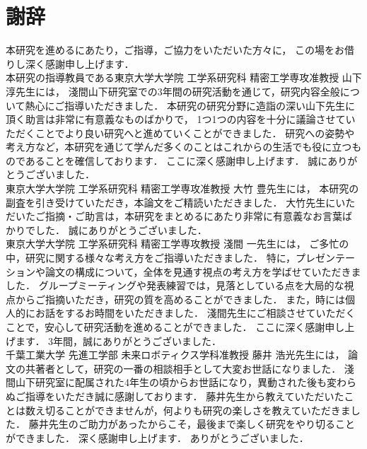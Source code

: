 \chapter*{謝辞}
\thispagestyle{empty}
\label{thankyou}

\newpage

本研究を進めるにあたり，ご指導，ご協力をいただいた方々に，
この場をお借りし深く感謝申し上げます．
\\

本研究の指導教員である東京大学大学院 工学系研究科 精密工学専攻准教授 山下 淳先生には，
淺間山下研究室での3年間の研究活動を通じて，研究内容全般について熱心にご指導いただきました．
本研究の研究分野に造詣の深い山下先生に頂く助言は非常に有意義なものばかりで，
1つ1つの内容を十分に議論させていただくことでより良い研究へと進めていくことができました．
研究への姿勢や考え方など，本研究を通じて学んだ多くのことはこれからの生活でも役に立つものであることを確信しております．
ここに深く感謝申し上げます．
誠にありがとうございました．
\\

東京大学大学院 工学系研究科 精密工学専攻准教授 大竹 豊先生には，
本研究の副査を引き受けていただき，本論文をご精読いただきました．
大竹先生にいただいたご指摘・ご助言は，本研究をまとめるにあたり非常に有意義なお言葉ばかりでした．
誠にありがとうございました．
\\

東京大学大学院 工学系研究科 精密工学専攻教授 淺間 一先生には，
ご多忙の中，研究に関する様々な考え方をご指導いただきました．
特に，プレゼンテーションや論文の構成について，全体を見通す視点の考え方を学ばせていただきました．
グループミーティングや発表練習では，見落としている点を大局的な視点からご指摘いただき，研究の質を高めることができました．
また，時には個人的にお話をするお時間をいただきました．
淺間先生にご相談させていただくことで，安心して研究活動を進めることができました．
ここに深く感謝申し上げます．
3年間，誠にありがとうございました．
\\

千葉工業大学 先進工学部 未来ロボティクス学科准教授 藤井 浩光先生には，
論文の共著者として，研究の一番の相談相手として大変お世話になりました．
淺間山下研究室に配属された4年生の頃からお世話になり，異動された後も変わらぬご指導をいただき誠に感謝しております．
藤井先生から教えていただいたことは数え切ることができませんが，何よりも研究の楽しさを教えていただきました．
藤井先生のご助力があったからこそ，最後まで楽しく研究をやり切ることができました．
深く感謝申し上げます．
ありがとうございました．
\\

